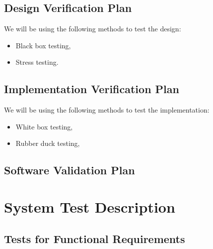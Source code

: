 \documentclass[12pt, titlepage]{article}
\begin{document}
\subsection{Design Verification Plan}

We will be using the following methods to test the design:

\begin{itemize}
	\item Black box testing,
	\item Stress testing.
\end{itemize}

\subsection{Implementation Verification Plan}
We will be using the following methods to test the implementation:

\begin{itemize}
	\item White box testing,
	\item Rubber duck testing,
\end{itemize}


%

\subsection{Software Validation Plan}


\section{System Test Description}
	
\subsection{Tests for Functional Requirements}



\end{document}
